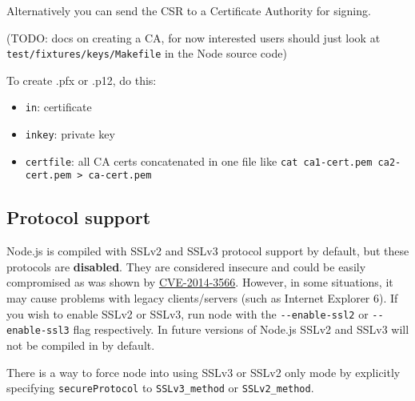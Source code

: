 Alternatively you can send the CSR to a Certificate Authority for
signing.

(TODO: docs on creating a CA, for now interested users should just look
at \texttt{test/fixtures/keys/Makefile} in the Node source code)

To create .pfx or .p12, do this:

\begin{Shaded}
\begin{Highlighting}[]
 \NormalTok{-}   \NormalTok{\textbackslash{}}
     
\end{Highlighting}
\end{Shaded}

\begin{itemize}
\itemsep1pt\parskip0pt
\item
  \texttt{in}: certificate
\item
  \texttt{inkey}: private key
\item
  \texttt{certfile}: all CA certs concatenated in one file like
  \texttt{cat\ ca1-cert.pem\ ca2-cert.pem\ \textgreater{}\ ca-cert.pem}
\end{itemize}

\subsection{Protocol support}\label{protocol-support}

Node.js is compiled with SSLv2 and SSLv3 protocol support by default,
but these protocols are \textbf{disabled}. They are considered insecure
and could be easily compromised as was shown by
\href{https://access.redhat.com/articles/1232123}{CVE-2014-3566}.
However, in some situations, it may cause problems with legacy
clients/servers (such as Internet Explorer 6). If you wish to enable
SSLv2 or SSLv3, run node with the \texttt{-\/-enable-ssl2} or
\texttt{-\/-enable-ssl3} flag respectively. In future versions of
Node.js SSLv2 and SSLv3 will not be compiled in by default.

There is a way to force node into using SSLv3 or SSLv2 only mode by
explicitly specifying \texttt{secureProtocol} to
\texttt{\textquotesingle{}SSLv3\_method\textquotesingle{}} or
\texttt{\textquotesingle{}SSLv2\_method\textquotesingle{}}.

